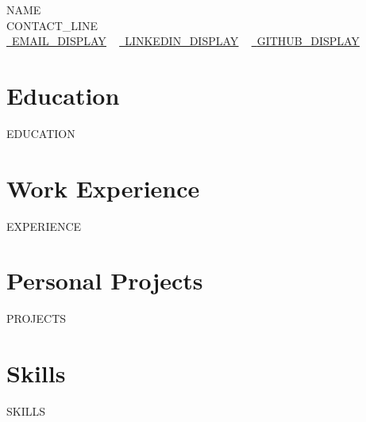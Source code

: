 \documentclass[letterpaper,11pt]{article}
\newcommand{\resumeSubHeadingListStart}{\begin{itemize}[leftmargin=0.0in, label={}]}
\newcommand{\resumeSubHeadingListEnd}{\end{itemize}}
\begin{document}
    \begin{center}
        {\Huge\scshape {{NAME}}}
        \\ {{CONTACT_LINE}}\\
        \small
        \href{mailto:{{EMAIL_URL}}}{\raisebox{-0.2\height}\faEnvelope\  \underline{{{EMAIL_DISPLAY}}}} ~
        \href{{{LINKEDIN_URL}}}{\raisebox{-0.2\height}\faLinkedin\ \underline{{{LINKEDIN_DISPLAY}}}}  ~
        \href{{{GITHUB_URL}}}{\raisebox{-0.2\height}\faGithub\ \underline{{{GITHUB_DISPLAY}}}}
    \end{center}

\section{Education}
  \resumeSubHeadingListStart
{{EDUCATION}}
  \resumeSubHeadingListEnd

\section{Work Experience}
  \resumeSubHeadingListStart
{{EXPERIENCE}}
  \resumeSubHeadingListEnd

\section{Personal Projects}
\resumeSubHeadingListStart
{{PROJECTS}}
\resumeSubHeadingListEnd

\section{Skills}
\vspace{-7pt}
\begin{itemize}
[leftmargin=0.15in, label={}]\small{\item{
{{SKILLS}}
}}
\end{itemize}
\end{document}

